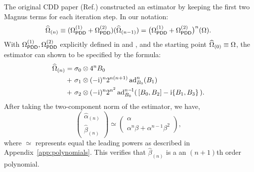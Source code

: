 \documentclass[pra,reprint,superscriptaddress]{revtex4-2}
\newcommand{\Opdd}{\Omega_{\mathsf{PDD}}}
\begin{document}
{The original CDD paper (Ref.\cite{khodjasteh2005fault}) constructed an estimator by keeping the first two Magnus terms for each iteration step. In
our notation:
\begin{equation}
    \Ohat_{(n)} \equiv (\Opdd\up{1} + \Opdd\up{2}) (\Ohat_{(n-1)}) = \big(\Opdd\up{1} + \Opdd\up{2}\big)^n (\Omega).
\end{equation}
With $\Opdd\up{1}, \Opdd\up{2}$ explicitly defined in  and , and the starting point $\widehat{\Omega}_{(0)}\equiv\Omega$,  the estimator can shown to be specified by the formula:
\begin{align}\label{eq:cdd-estimator}
\widehat{\Omega}_{(n)} 
={} & \sigma_0 \otimes 4^n B_0 \notag \\
+\ & \sigma_1 \otimes (-\mathrm{i})^{n} 2^{n(n+1)} \operatorname{ad}_{B_0}^{n}(B_1)\\ 
+\ & \sigma_2 \otimes (-\mathrm{i})^{n} 2^{n^2} \operatorname{ad}_{B_0}^{n-\!1}( \,[B_0,B_2] - \mathrm{i} \{B_1,B_3\} \,). \notag
\end{align} 
After taking the two-component norm of the estimator, we have,
\begin{equation}
\begin{pmatrix}
\widehat\alpha_{(n)}\\
\widehat\beta_{(n)}
\end{pmatrix}
\simeq
\begin{pmatrix}
\alpha\\
\alpha^{n} \beta +\alpha^{n-1} \beta^2
\end{pmatrix},
\end{equation}
where $\simeq$ represents equal the leading powers as described in Appendix~\ref{app:polynomials}. 
This verifies that $\widehat\beta_{(n)}$ is a an $(n+1)$th order polynomial.

}
\end{document}
